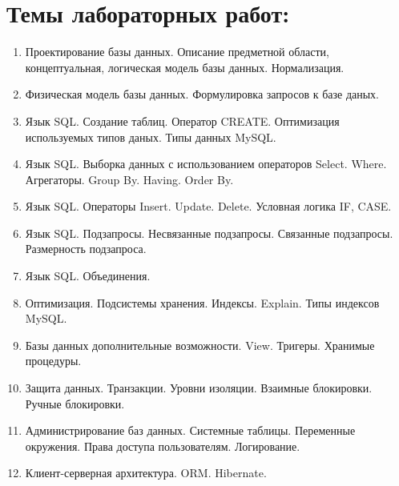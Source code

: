 \documentclass[12pt,a4paper]{article}
\begin{document}
\section{Темы лабораторных работ:}
\begin{enumerate}
    \item Проектирование базы данных. Описание предметной области, концептуальная, логическая модель базы данных. Нормализация.
    \item Физическая модель базы данных. Формулировка запросов к базе даных.
    \item Язык SQL. Создание таблиц. Оператор CREATE. Оптимизация используемых типов даных. Типы данных MySQL.
    \item Язык SQL. Выборка данных с использованием операторов Select. Where. Агрегаторы. Group By. Having. Order By.
    \item Язык SQL. Операторы Insert. Update. Delete. Условная логика IF, CASE.
    \item Язык SQL. Подзапросы. Несвязанные подзапросы. Связанные подзапросы. Размерность подзапроса.
    \item Язык SQL. Объединения.
    \item Оптимизация. Подсистемы хранения. Индексы. Explain. Типы индексов MySQL. 
    \item Базы данных дополнительные возможности. View. Тригеры. Хранимые процедуры.
    \item Защита данных. Транзакции. Уровни изоляции. Взаимные блокировки. Ручные блокировки.
    \item Администрирование баз данных. Системные таблицы. Переменные окружения. Права доступа пользователям. Логирование.
    \item Клиент-серверная архитектура. ORM. Hibernate. 
\end{enumerate}
\end{document}
